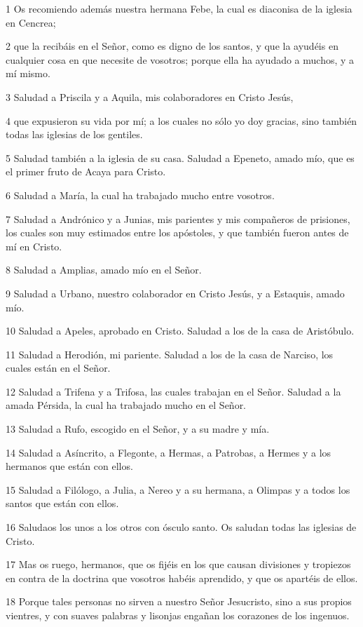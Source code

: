 \par 1 Os recomiendo además nuestra hermana Febe, la cual es diaconisa de la iglesia en Cencrea;
\par 2 que la recibáis en el Señor, como es digno de los santos, y que la ayudéis en cualquier cosa en que necesite de vosotros; porque ella ha ayudado a muchos, y a mí mismo.
\par 3 Saludad a Priscila y a Aquila, mis colaboradores en Cristo Jesús,
\par 4 que expusieron su vida por mí; a los cuales no sólo yo doy gracias, sino también todas las iglesias de los gentiles.
\par 5 Saludad también a la iglesia de su casa. Saludad a Epeneto, amado mío, que es el primer fruto de Acaya para Cristo.
\par 6 Saludad a María, la cual ha trabajado mucho entre vosotros.
\par 7 Saludad a Andrónico y a Junias, mis parientes y mis compañeros de prisiones, los cuales son muy estimados entre los apóstoles, y que también fueron antes de mí en Cristo.
\par 8 Saludad a Amplias, amado mío en el Señor.
\par 9 Saludad a Urbano, nuestro colaborador en Cristo Jesús, y a Estaquis, amado mío.
\par 10 Saludad a Apeles, aprobado en Cristo. Saludad a los de la casa de Aristóbulo.
\par 11 Saludad a Herodión, mi pariente. Saludad a los de la casa de Narciso, los cuales están en el Señor.
\par 12 Saludad a Trifena y a Trifosa, las cuales trabajan en el Señor. Saludad a la amada Pérsida, la cual ha trabajado mucho en el Señor.
\par 13 Saludad a Rufo, escogido en el Señor, y a su madre y mía.
\par 14 Saludad a Asíncrito, a Flegonte, a Hermas, a Patrobas, a Hermes y a los hermanos que están con ellos.
\par 15 Saludad a Filólogo, a Julia, a Nereo y a su hermana, a Olimpas y a todos los santos que están con ellos.
\par 16 Saludaos los unos a los otros con ósculo santo. Os saludan todas las iglesias de Cristo.
\par 17 Mas os ruego, hermanos, que os fijéis en los que causan divisiones y tropiezos en contra de la doctrina que vosotros habéis aprendido, y que os apartéis de ellos.
\par 18 Porque tales personas no sirven a nuestro Señor Jesucristo, sino a sus propios vientres, y con suaves palabras y lisonjas engañan los corazones de los ingenuos.

